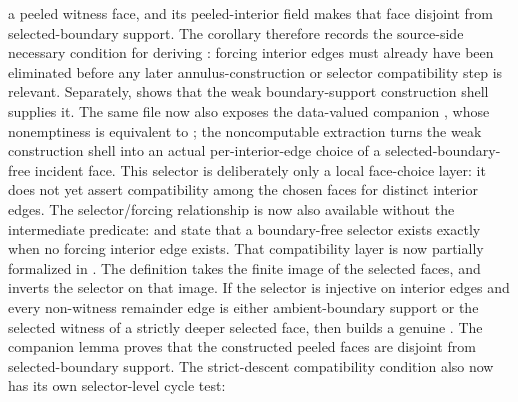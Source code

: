 \documentclass[11pt]{article}
\begin{document}
a peeled witness face, and its peeled-interior field makes that face disjoint
from selected-boundary support.  The corollary
therefore records the source-side necessary condition for deriving
: forcing interior edges must
already have been eliminated before any later annulus-construction or selector
compatibility step is relevant.  Separately,
shows that the weak boundary-support construction shell supplies it.  The
same file now also exposes the data-valued companion
, whose nonemptiness is equivalent to
; the noncomputable
extraction
turns the weak construction shell into an actual per-interior-edge choice of a
selected-boundary-free incident face.  This selector is deliberately only a
local face-choice layer: it does not yet assert compatibility among the chosen
faces for distinct interior edges.  The selector/forcing relationship is now
also available without the intermediate predicate:
and
state that a boundary-free selector exists exactly when no forcing interior edge
exists.  That compatibility layer is now partially
formalized in .  The
definition  takes the finite
image of the selected faces, and
 inverts the
selector on that image.  If the selector is injective on interior edges and
every non-witness remainder edge is either ambient-boundary support or the
selected witness of a strictly deeper selected face, then
builds a genuine .  The companion
lemma
proves that the constructed peeled faces are disjoint from selected-boundary
support.  The strict-descent compatibility condition also now has its own
selector-level cycle test: 
\end{document}
